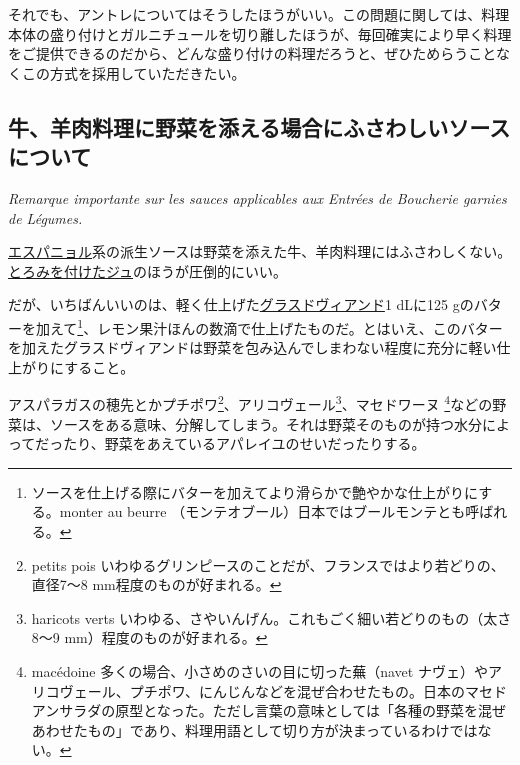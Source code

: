 \begin{Main}
それでも、アントレについてはそうしたほうがいい。この問題に関しては、料理本体の盛り付けとガルニチュールを切り離したほうが、毎回確実により早く料理をご提供できるのだから、どんな盛り付けの料理だろうと、ぜひためらうことなくこの方式を採用していただきたい。

\hypertarget{remarque-importante-sur-les-sauces-applicables-aux-entrees-de-boucherie-garnie-de-legumes}{%
\subsection{牛、羊肉料理に野菜を添える場合にふさわしいソースについて}\label{remarque-importante-sur-les-sauces-applicables-aux-entrees-de-boucherie-garnie-de-legumes}}

\vspace{-1\zw}
\begin{center}
\textit{Remarque importante sur les sauces applicables aux Entrées de Boucherie garnies de Légumes.}
\end{center}


\vspace{1\zw}

\protect\hyperlink{sauce-espagnole}{エスパニョル}系の派生ソースは野菜を添えた牛、羊肉料理にはふさわしくない。\protect\hyperlink{jus-de-veau-lie}{とろみを付けたジュ}のほうが圧倒的にいい。

だが、いちばんいいのは、軽く仕上げた\protect\hyperlink{glace-de-viande}{グラスドヴィアンド}1
dLに125 gのバターを加えて\footnote{ソースを仕上げる際にバターを加えてより滑らかで艶やかな仕上がりにする。monter
  au beurre （モンテオブール）日本ではブールモンテとも呼ばれる。}、レモン果汁ほんの数滴で仕上げたものだ。とはいえ、このバターを加えたグラスドヴィアンドは野菜を包み込んでしまわない程度に充分に軽い仕上がりにすること。

アスパラガスの穂先とかプチポワ\footnote{petits pois
  いわゆるグリンピースのことだが、フランスではより若どりの、直径7〜8
  mm程度のものが好まれる。}、アリコヴェール\footnote{haricots verts
  いわゆる、さやいんげん。これもごく細い若どりのもの（太さ8〜9
  mm）程度のものが好まれる。}、マセドワーヌ \footnote{macédoine
  多くの場合、小さめのさいの目に切った蕪（navet
  ナヴェ）やアリコヴェール、プチポワ、にんじんなどを混ぜ合わせたもの。日本のマセドアンサラダの原型となった。ただし言葉の意味としては「各種の野菜を混ぜあわせたもの」であり、料理用語として切り方が決まっているわけではない。}などの野菜は、ソースをある意味、分解してしまう。それは野菜そのものが持つ水分によってだったり、野菜をあえているアパレイユのせいだったりする。


\end{Main}
